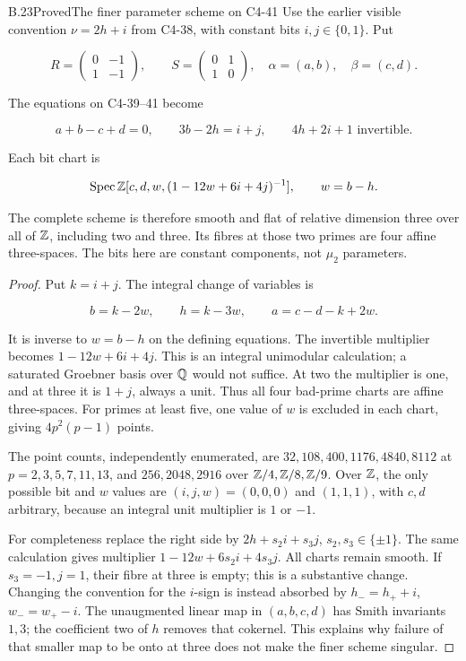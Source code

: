 \begin{statement}{B.23}{Proved}{The finer parameter scheme on C4-41}
Use the earlier visible convention $\nu=2h+i$ from C4-38,
with constant bits $i,j\in\{0,1\}$.
Put

$$
R=\begin{pmatrix}0&-1\\1&-1\end{pmatrix},\qquad
 S=\begin{pmatrix}0&1\\1&0\end{pmatrix},\quad
 \alpha=(a,b),\quad\beta=(c,d).
$$

The equations on C4-39--41 become

$$
a+b-c+d=0,\qquad 3b-2h=i+j,\qquad
 4h+2i+1\text{ invertible}.
$$

Each bit chart is

$$
\operatorname{Spec}\mathbb Z[c,d,w,(1-12w+6i+4j)^{-1}],
 \qquad w=b-h.
$$

The complete scheme is therefore smooth and flat of relative
dimension three over all of $\mathbb Z$, including two and three.
Its fibres at those two primes are four affine three-spaces.
The bits here are constant components, not $\mu_2$ parameters.
\end{statement}
\begin{proof}
Put $k=i+j$. The integral change of variables is

$$
b=k-2w,\qquad h=k-3w,\qquad
 a=c-d-k+2w.
$$

It is inverse to $w=b-h$ on the defining equations.
The invertible multiplier becomes
$1-12w+6i+4j$.
This is an integral unimodular calculation; a saturated
Groebner basis over $\mathbb Q$ would not suffice.
At two the multiplier is one, and at three it is $1+j$,
always a unit. Thus all four bad-prime charts are affine
three-spaces. For primes at least five, one value of $w$
is excluded in each chart, giving $4p^2(p-1)$ points.

The point counts, independently enumerated, are
$32,108,400,1176,4840,8112$ at
$p=2,3,5,7,11,13$, and $256,2048,2916$ over
$\mathbb Z/4,\mathbb Z/8,\mathbb Z/9$.
Over $\mathbb Z$, the only possible bit and $w$ values are
$(i,j,w)=(0,0,0)$ and $(1,1,1)$, with $c,d$ arbitrary,
because an integral unit multiplier is $1$ or $-1$.

For completeness replace the right side by
$2h+s_2i+s_3j$, $s_2,s_3\in\{\pm1\}$.
The same calculation gives multiplier
$1-12w+6s_2i+4s_3j$.
All charts remain smooth. If $s_3=-1,j=1$, their fibre
at three is empty; this is a substantive change.
Changing the convention for the $i$-sign is instead
absorbed by $h_-=h_++i$, $w_-=w_+-i$.
The unaugmented linear map in $(a,b,c,d)$ has Smith
invariants $1,3$; the coefficient two of $h$ removes that
cokernel. This explains why failure of that smaller map
to be onto at three does not make the finer scheme singular.
\end{proof}
